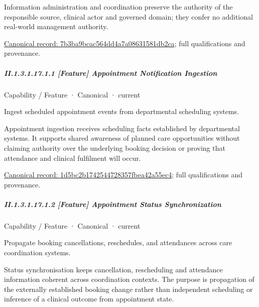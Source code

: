 Information administration and coordination preserve the authority of the responsible source, clinical actor and governed domain; they confer no additional real-world management authority.


{\footnotesize \href{../../../../../../../continuum/strategy/capability/7b3ba9bcac564dd4a7a08631581db2ca.md}{Canonical record: 7b3ba9bcac564dd4a7a08631581db2ca}; full qualifications and provenance.}\par
\subparagraph*{II.1.3.1.17.1.1 [Feature] Appointment Notification Ingestion}
\label{navigation:II.1.3.1.17.1.1}

\label{element:1d5bc2b1742544728357fbea42a55ec4}
{\small Capability / Feature · Canonical · current}\par

Ingest scheduled appointment events from departmental scheduling systems.



Appointment ingestion receives scheduling facts established by departmental systems. It supports shared awareness of planned care opportunities without claiming authority over the underlying booking decision or proving that attendance and clinical fulfilment will occur.


{\footnotesize \href{../../../../../../../continuum/strategy/capability/feature/1d5bc2b1742544728357fbea42a55ec4.md}{Canonical record: 1d5bc2b1742544728357fbea42a55ec4}; full qualifications and provenance.}\par
\subparagraph*{II.1.3.1.17.1.2 [Feature] Appointment Status Synchronization}
\label{navigation:II.1.3.1.17.1.2}

\label{element:a7a9932600d84434a1a37005f726747d}
{\small Capability / Feature · Canonical · current}\par

Propagate booking cancellations, reschedules, and attendances across care coordination systems.



Status synchronisation keeps cancellation, rescheduling and attendance information coherent across coordination contexts. The purpose is propagation of the externally established booking change rather than independent scheduling or inference of a clinical outcome from appointment state.



